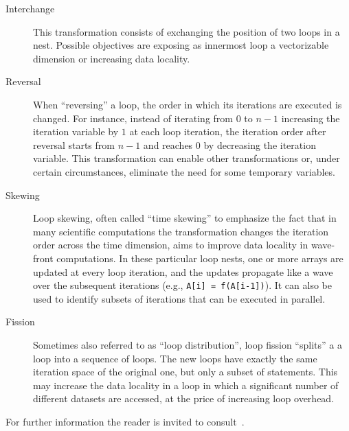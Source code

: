 \begin{description}
\item[Interchange] This transformation consists of exchanging the position of two loops in a nest. Possible objectives are exposing as innermost loop a vectorizable dimension or increasing data locality. 
\item[Reversal] When ``reversing'' a loop, the order in which its iterations are executed is changed. For instance, instead of iterating from $0$ to $n-1$ increasing the iteration variable by $1$ at each loop iteration, the iteration order after reversal starts from $n-1$ and reaches $0$ by decreasing the iteration variable. This transformation can enable other transformations or, under certain circumstances, eliminate the need for some temporary variables.
\item[Skewing] Loop skewing, often called ``time skewing'' to emphasize the fact that in many scientific computations the transformation changes the iteration order across the time dimension, aims to improve data locality in wave-front computations. In these particular loop nests, one or more arrays are updated at every loop iteration, and the updates propagate like a wave over the subsequent iterations (e.g., \texttt{A[i] = f(A[i-1])}). It can also be used to identify subsets of iterations that can be executed in parallel.
\item[Fission] Sometimes also referred to as ``loop distribution'', loop fission ``splits'' a a loop into a sequence of loops. The new loops have exactly the same iteration space of the original one, but only a subset of statements. This may increase the data locality in a loop in which a significant number of different datasets are accessed, at the price of increasing loop overhead.
\end{description}
For further information the reader is invited to consult~\cite{bacon-comp-transf}.

